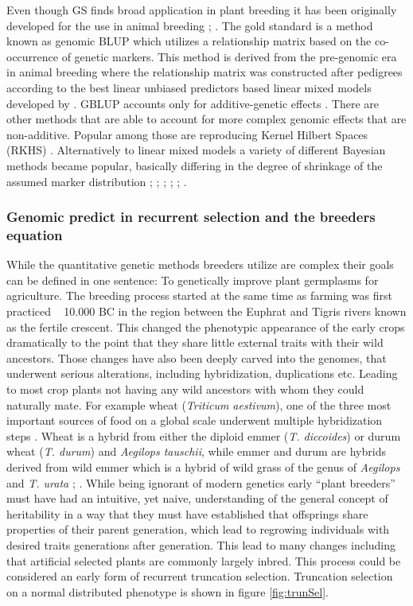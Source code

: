 Even though GS finds broad application in plant breeding it has been originally developed for the use in
animal breeding \cite{hayes2010genome}; \cite{goddard2011using}. The gold standard is a method known as
genomic BLUP \cite{vanraden2008efficient} which utilizes a relationship matrix based on the co-occurrence of
genetic markers. This method is derived from the pre-genomic era in animal breeding where the relationship
matrix was constructed after pedigrees according to the best linear unbiased predictors based linear mixed
models developed by \cite{henderson1975best}. GBLUP accounts only for additive-genetic effects
\cite{vanraden2008efficient}. There are other methods that are able to account for more complex genomic
effects that are non-additive. Popular among those are reproducing Kernel Hilbert Spaces (RKHS)
\cite{gianola2008reproducing}. Alternatively to linear mixed models a variety of different Bayesian methods
became popular, basically differing in the degree of shrinkage of the assumed marker distribution
\cite{hayes2001}; \cite{gianola2009}; \cite{habier2011}; \cite{gianola2013}; \cite{crossa2017};
\cite{azodi2019}.

\subsubsection{Genomic predict in recurrent selection and the breeders equation}

While the quantitative genetic methods breeders utilize are complex their goals can be defined in one
sentence: To genetically improve plant germplasms for agriculture. The breeding process started at the same
time as farming was first practiced ~ 10.000 BC in the region between the Euphrat and Tigris rivers known as
the fertile crescent. This changed the phenotypic appearance of the early crops dramatically to the point that
they share little external traits with their wild ancestors. Those changes have also been deeply carved into
the genomes, that underwent serious alterations, including hybridization, duplications etc. Leading to most
crop plants not having any wild ancestors with whom they could naturally mate. For example wheat
(\textit{Triticum aestivum}), one of the three most important sources of food on a global scale underwent
multiple hybridization steps \cite{ozkan2001allopolyploidy}. Wheat is a hybrid from either the diploid emmer
(\textit{T. diccoides}) or durum wheat (\textit{T. durum}) and \textit{{Aegilops tauschii}}, while emmer and
durum are hybrids derived from wild emmer which is a hybrid of wild grass of the genus of \textit{Aegilops}
and \textit{T. urata} \cite{friebe2000development}; \cite{feldman2012genome}. While being ignorant of modern
genetics early ``plant breeders'' must have had an intuitive, yet naive, understanding of the general concept
of heritability in a way that they must have established that offsprings share properties of their parent
generation, which lead to regrowing individuals with desired traits generations after generation. This lead to
many changes including that artificial selected plants are commonly largely inbred. This process could be
considered an early form of recurrent truncation selection. Truncation selection on a normal distributed
phenotype is shown in figure \ref{fig:trunSel}.
 
